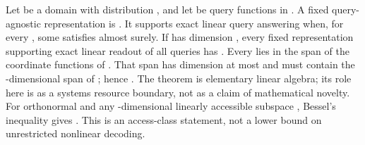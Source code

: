 \markdownRendererDocumentBegin
\markdownRendererSectionBegin
{}\markdownRendererInterblockSeparator
{}Let  be a domain with distribution , and let  be query functions in . A fixed query-agnostic representation is . It supports exact linear query answering when, for every , some  satisfies  almost surely.\markdownRendererInterblockSeparator
{}\markdownRendererSectionBegin
{}\markdownRendererInterblockSeparator
{}If  has dimension , every fixed representation supporting exact linear readout of all queries has .\markdownRendererInterblockSeparator
{} Every  lies in the span of the  coordinate functions of . That span has dimension at most  and must contain the -dimensional span of ; hence . The theorem is elementary linear algebra; its role here is as a systems resource boundary, not as a claim of mathematical novelty.\markdownRendererInterblockSeparator
{}
\markdownRendererSectionEnd \markdownRendererSectionBegin
{}\markdownRendererInterblockSeparator
{}For orthonormal  and any -dimensional linearly accessible subspace , Bessel's inequality gives . This is an access-class statement, not a lower bound on unrestricted nonlinear decoding.\markdownRendererInterblockSeparator
